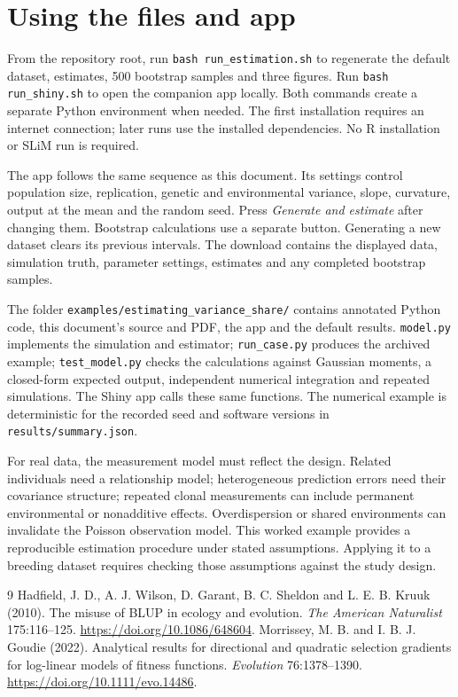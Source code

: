 \documentclass[11pt]{article}
\begin{document}
\section{Using the files and app}

From the repository root, run \texttt{bash run\_estimation.sh} to regenerate the default dataset, estimates, 500 bootstrap samples and three figures. Run \texttt{bash run\_shiny.sh} to open the companion app locally. Both commands create a separate Python environment when needed. The first installation requires an internet connection; later runs use the installed dependencies. No R installation or SLiM run is required.

The app follows the same sequence as this document. Its settings control population size, replication, genetic and environmental variance, slope, curvature, output at the mean and the random seed. Press \emph{Generate and estimate} after changing them. Bootstrap calculations use a separate button. Generating a new dataset clears its previous intervals. The download contains the displayed data, simulation truth, parameter settings, estimates and any completed bootstrap samples.

The folder \texttt{examples/estimating\_variance\_share/} contains annotated Python code, this document's source and PDF, the app and the default results. \texttt{model.py} implements the simulation and estimator; \texttt{run\_case.py} produces the archived example; \texttt{test\_model.py} checks the calculations against Gaussian moments, a closed-form expected output, independent numerical integration and repeated simulations. The Shiny app calls these same functions. The numerical example is deterministic for the recorded seed and software versions in \texttt{results/summary.json}.

For real data, the measurement model must reflect the design. Related individuals need a relationship model; heterogeneous prediction errors need their covariance structure; repeated clonal measurements can include permanent environmental or nonadditive effects. Overdispersion or shared environments can invalidate the Poisson observation model. This worked example provides a reproducible estimation procedure under stated assumptions. Applying it to a breeding dataset requires checking those assumptions against the study design.

\begin{thebibliography}{9}
 Hadfield, J. D., A. J. Wilson, D. Garant, B. C. Sheldon and L. E. B. Kruuk (2010). The misuse of BLUP in ecology and evolution. \emph{The American Naturalist} 175:116--125. \url{https://doi.org/10.1086/648604}.
 Morrissey, M. B. and I. B. J. Goudie (2022). Analytical results for directional and quadratic selection gradients for log-linear models of fitness functions. \emph{Evolution} 76:1378--1390. \url{https://doi.org/10.1111/evo.14486}.
\end{thebibliography}
\end{document}
